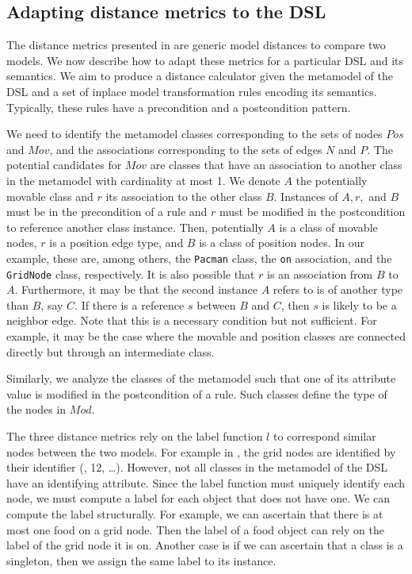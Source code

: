 \subsection{Adapting distance metrics to the DSL}

The distance metrics presented in  are generic model distances to compare two models.
We now describe how to adapt these metrics for a particular DSL and its semantics.
We aim to produce a distance calculator given the metamodel of the DSL and a set of inplace model transformation rules encoding its semantics.
Typically, these rules have a precondition and a postcondition pattern.

We need to identify the metamodel classes corresponding to the sets of nodes $Pos$ and $Mov$, and the associations corresponding to the sets of edges $N$ and $P$.
The potential candidates for $Mov$ are classes that have an association to another class in the metamodel with cardinality at most 1.
We denote $A$ the potentially movable class and $r$ its association to the other class $B$.
Instances of $A,r,$ and $B$ must be in the precondition of a rule and $r$ must be modified in the postcondition to reference another class instance.
Then, potentially $A$ is a class of movable nodes, $r$ is a position edge type, and $B$ is a class of position nodes.
In our example, these are, among others, the \texttt{Pacman} class, the \texttt{on} association, and the \texttt{GridNode} class, respectively.
It is also possible that $r$ is an association from $B$ to $A$.
Furthermore, it may be that the second instance $A$ refers to is of another type than $B$, say $C$.
If there is a reference $s$ between $B$ and $C$, then $s$ is likely to be a neighbor edge.
Note that this is a necessary condition but not sufficient.
For example, it may be the case where the movable and position classes are connected directly but through an intermediate class.

Similarly, we analyze the classes of the metamodel such that one of its attribute value is modified in the postcondition of a rule.
Such classes define the type of the nodes in $Mod$.

The three distance metrics rely on the label function $l$ to correspond similar nodes between the two models.
For example in , the grid nodes are identified by their identifier (, 12, \ldots).
However, not all classes in the metamodel of the DSL have an identifying attribute.
Since the label function must uniquely identify each node, we must compute a label for each object that does not have one.
We can compute the label structurally.
For example, we can ascertain that there is at most one food on a grid node.
Then the label of a food object can rely on the label of the grid node it is on.
Another case is if we can ascertain that a class is a singleton, then we assign the same label to its instance.

